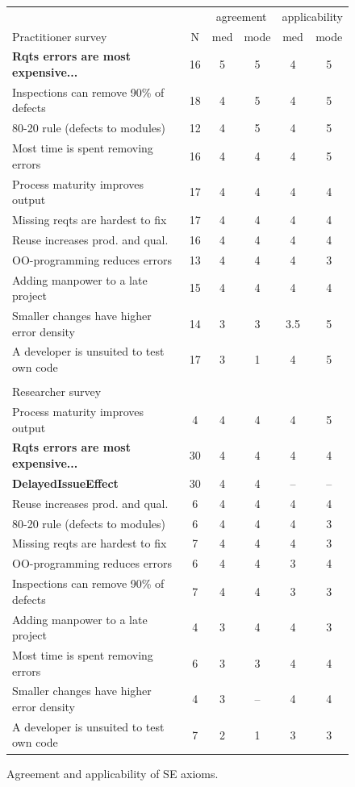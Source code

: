 \documentclass[smallcondensed]{svjour3}
\begin{document}
\begin{figure}[ht] 
\scriptsize 
 \begin{center}
\begin{tabular}{l|c|c|c|c|c}
 &  & \multicolumn{2}{c|}{agreement} & \multicolumn{2}{c}{applicability} \\
Practitioner survey  & N & med & mode & med & mode \\
\hline 
\textbf{Rqts errors are most expensive...} & 16 & 5 & 5 & 4 & 5 \\ 
Inspections can remove 90\% of defects & 18 & 4 & 5 & 4 & 5 \\
80-20 rule (defects to modules) & 12 & 4 & 5 & 4 & 5 \\
Most time is spent removing errors & 16 & 4 & 4 & 4 & 5 \\ 
Process maturity improves output & 17 & 4 & 4 & 4 & 4 \\ 
Missing reqts are hardest to fix & 17 & 4 & 4 & 4 & 4 \\
Reuse increases prod. and qual. & 16 & 4 & 4 & 4 & 4 \\
OO-programming reduces errors & 13 & 4 & 4 & 4 & 3 \\
Adding manpower to a late project & 15 & 4 & 4 & 4 & 4 \\
Smaller changes have higher error density & 14 & 3 & 3 & 3.5 & 5 \\
A developer is unsuited to test own code & 17 & 3 & 1 & 4 & 5\\
 \multicolumn{6}{l}{}\\
\multicolumn{6}{l}{Researcher survey} \\\hline 
Process maturity improves output & 4 & 4 & 4 & 4 & 5 \\
\textbf{Rqts errors are most expensive...} & 30 & 4 & 4 & 4 & 4   \\ 
\textbf{DelayedIssueEffect} & 30 & 4 & 4 & -- & --  \\
Reuse increases prod. and qual. & 6 & 4 & 4 & 4 & 4 \\
80-20 rule (defects to modules) & 6 & 4 & 4 & 4 & 3 \\
Missing reqts are hardest to fix & 7 & 4 & 4 & 4 & 3 \\
OO-programming reduces errors & 6 & 4 & 4 & 3 & 4 \\
Inspections can remove 90\% of defects & 7 & 4 & 4 & 3 & 3 \\
Adding manpower to a late project & 4 & 3 & 4 & 4 & 3 \\
Most time is spent removing errors & 6 & 3 & 3 & 4 & 4 \\ 
Smaller changes have higher error density & 4 & 3 & -- & 4 & 4 \\
A developer is unsuited to test own code & 7 & 2 & 1 & 3 & 3
\end{tabular} 
 \end{center}
\caption{Agreement and applicability of SE axioms.}
\label{fig:survey_results}
\end{figure}
\end{document}
